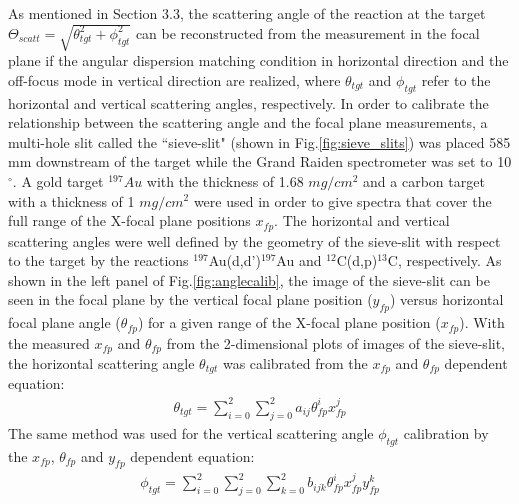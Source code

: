 As mentioned in Section 3.3, the scattering angle of the reaction at the target $\Theta_{scatt}=\sqrt{\theta_{tgt}^2 + \phi_{tgt}^2}$ can be reconstructed from the measurement in the focal plane if the angular dispersion matching condition in horizontal direction and the off-focus mode in vertical direction  are realized, where $\theta_{tgt}$  and $\phi_{tgt}$ refer to the horizontal and vertical scattering angles, respectively. In order to calibrate the relationship between the scattering angle and the focal plane measurements, a multi-hole slit called the ``sieve-slit" (shown in Fig.\ref{fig:sieve_slits}) was placed 585 mm downstream of  the target  while the Grand Raiden spectrometer was set to 10$^{\circ}$. A gold target $^{197}Au$ with the thickness of 1.68 $mg/cm^2$ and a carbon target with a thickness of 1 $mg/cm^2$ were used in order to give spectra that cover the full range of the X-focal plane positions $x_{fp}$. The horizontal and vertical scattering angles were well defined by the geometry of the sieve-slit with respect to the target by the reactions $^{197}$Au(d,d')$^{197}$Au and $^{12}$C(d,p)$^{13}$C, respectively. As  shown in the left panel of Fig.\ref{fig:anglecalib}, the image of the sieve-slit can be seen in the focal plane by the vertical focal plane position ($y_{fp}$) versus horizontal focal plane angle ($\theta_{fp}$) for a given range of the X-focal plane position ($x_{fp}$). With the measured $x_{fp}$ and $\theta_{fp}$ from the 2-dimensional plots of images of the sieve-slit, the horizontal scattering angle $\theta_{tgt}$ was calibrated from the $x_{fp}$ and $\theta_{fp}$ dependent equation:
\begin{equation}
    \label{eq:theta_calib}
    \begin{aligned}
        \theta_{tgt} =  \sum_{i=0}^{2} \sum_{j=0}^{2}  a_{ij} \theta_{fp}^i  x_{fp}^j
    \end{aligned}
\end{equation}
The same method was used for  the vertical scattering angle $\phi_{tgt}$ calibration by the $x_{fp}$, $\theta_{fp}$ and $y_{fp}$ dependent equation:
\begin{equation}
    \label{eq:phi_calib}
    \begin{aligned}
        \phi_{tgt} = \sum_{i=0}^2 \sum_{j=0}^2 \sum_{k=0}^2 b_{ijk} \theta_{fp}^i x_{fp}^j y_{fp}^k
    \end{aligned}
\end{equation}
